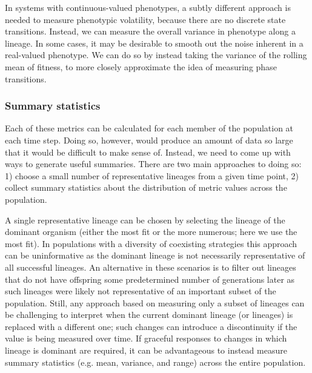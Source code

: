 \documentclass[letterpaper]{article}
\begin{document}
In systems with continuous-valued phenotypes, a subtly different approach is needed to measure phenotypic volatility, because there are no discrete state transitions. Instead, we can measure the overall variance in phenotype along a lineage. In some cases, it may be desirable to smooth out the noise inherent in a real-valued phenotype. We can do so by instead taking the variance of the rolling mean of fitness, to more closely approximate the idea of measuring phase transitions.



\subsubsection{Summary statistics}

Each of these metrics can be calculated for each member of the population at each time step. Doing so, however, would produce an amount of data so large that it would be difficult to make sense of. Instead, we need to come up with ways to generate useful summaries. There are two main approaches to doing so: 1) choose a small number of representative lineages from a given time point, 2) collect summary statistics about the distribution of metric values across the population.

A single representative lineage can be chosen by selecting the lineage of the dominant organism (either the most fit or the more numerous; here we use the most fit). In populations with a diversity of coexisting strategies this approach can be uninformative as the dominant lineage is not necessarily representative of all successful lineages. An alternative in these scenarios is to filter out lineages that do not have offspring some predetermined number of generations later as such lineages were likely not representative of an important subset of the population. Still, any approach based on measuring only a subset of lineages can be challenging to interpret when the current dominant lineage (or lineages) is replaced with a different one; such changes can introduce a discontinuity if the value is being measured over time. If graceful responses to changes in which lineage is dominant are required, it can be advantageous to instead measure summary statistics (e.g. mean, variance, and range) across the entire population. 
\end{document}

